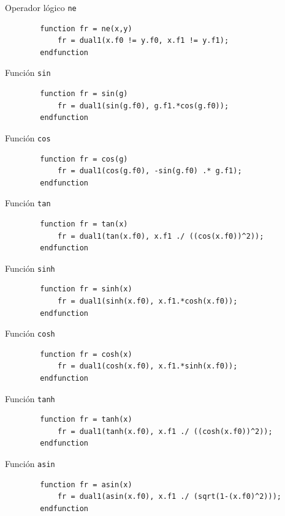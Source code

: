 \documentclass[a4paper, 12pt]{article}
\begin{document}
    Operador lógico \verb|ne|

    \begin{verbatim}
        function fr = ne(x,y)
            fr = dual1(x.f0 != y.f0, x.f1 != y.f1);
        endfunction
    \end{verbatim}

    Función \verb|sin|

    \begin{verbatim}
        function fr = sin(g)
            fr = dual1(sin(g.f0), g.f1.*cos(g.f0));
        endfunction
    \end{verbatim}

    Función \verb|cos|

    \begin{verbatim}
        function fr = cos(g)
            fr = dual1(cos(g.f0), -sin(g.f0) .* g.f1);
        endfunction
    \end{verbatim}

    Función \verb|tan|

    \begin{verbatim}
        function fr = tan(x)
            fr = dual1(tan(x.f0), x.f1 ./ ((cos(x.f0))^2));
        endfunction
    \end{verbatim}

    Función \verb|sinh|

    \begin{verbatim}
        function fr = sinh(x)
            fr = dual1(sinh(x.f0), x.f1.*cosh(x.f0));
        endfunction
    \end{verbatim}

    Función \verb|cosh|

    \begin{verbatim}
        function fr = cosh(x)
            fr = dual1(cosh(x.f0), x.f1.*sinh(x.f0));
        endfunction
    \end{verbatim}

    Función \verb|tanh|

    \begin{verbatim}
        function fr = tanh(x)
            fr = dual1(tanh(x.f0), x.f1 ./ ((cosh(x.f0))^2));
        endfunction
    \end{verbatim}

    Función \verb|asin|

    \begin{verbatim}
        function fr = asin(x)
            fr = dual1(asin(x.f0), x.f1 ./ (sqrt(1-(x.f0)^2)));
        endfunction
    \end{verbatim}
\end{document}
